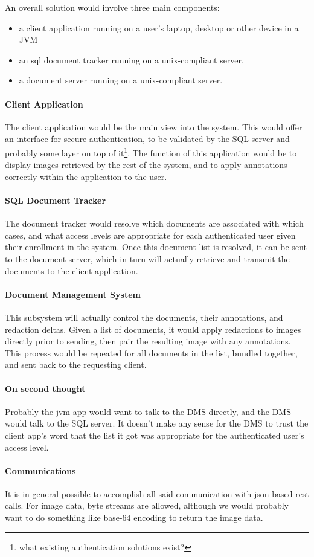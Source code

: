 An overall solution would involve three main components:
\begin{itemize}
	\item a client application running on a user's laptop, desktop or other
		device in a JVM
	\item an sql document tracker running on a unix-compliant server.
	\item a document server running on a unix-compliant server.
\end{itemize}

\paragraph{Client Application}The client application would be the main view
into the system.  This would offer an interface for secure authentication, to
be validated by the SQL server and probably some layer on top of
it\footnote{what existing authentication solutions exist?}.  The function of
this application would be to display images retrieved by the rest of the
system, and to apply annotations correctly within the application to the user.

\paragraph{SQL Document Tracker}The document tracker would resolve which
documents are associated with which cases, and what access levels are
appropriate for each authenticated user given their enrollment in the system.
Once this document list is resolved, it can be sent to the document server,
which in turn will actually retrieve and transmit the documents to the client
application.

\paragraph{Document Management System}This subsystem will actually control the
documents, their annotations, and redaction deltas.  Given a list of documents,
it would apply redactions to images directly prior to sending, then pair the
resulting image with any annotations.  This process would be repeated for all
documents in the list, bundled together, and sent back to the requesting
client.

\paragraph{On second thought}Probably the jvm app would want to talk to the DMS
directly, and the DMS would talk to the SQL server.  It doesn't make any sense
for the DMS to trust the client app's word that the list it got was appropriate
for the authenticated user's access level.

\paragraph{Communications}It is in general possible to accomplish all said
communication with json-based rest calls.  For image data, byte streams are
allowed, although we would probably want to do something like base-64 encoding
to return the image data.
